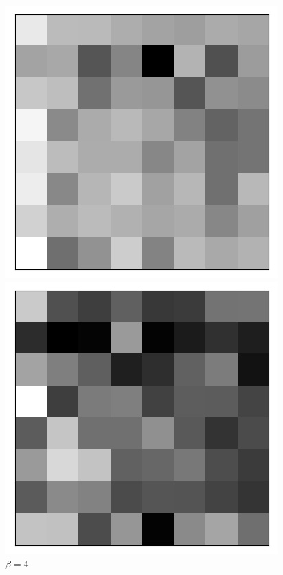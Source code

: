 \begin{figure}[h!]
\begin{multicols}{4}
    \caption{$\beta=1$}
    \includegraphics[scale=0.4]{figures/results/latent_image/beta_2_sample_10_latent.png}
    \caption{$\beta=2$}
    \includegraphics[scale=0.4]{figures/results/latent_image/beta_4_sample_10_latent.png}
    \caption{$\beta=4$}
\end{multicols}
\begin{multicols}{4}

\end{multicols}
\end{figure}
